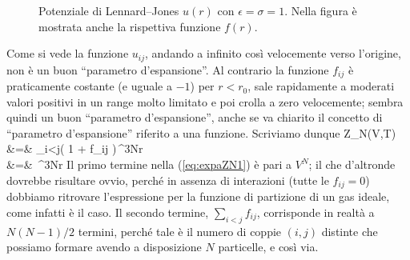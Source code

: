 \begin{figure}[h]
\centering
{}

\caption{Potenziale di Lennard--Jones $u(r)$ con $\epsilon=\sigma=1$. Nella figura è mostrata anche la rispettiva funzione $f(r)$.}
\label{fig:06-deffij}
\end{figure}

Come si vede la funzione $u_{ij}$, andando a infinito così velocemente verso l'origine, non è un buon ``parametro d'espansione''. Al contrario la funzione $f_{ij}$ è praticamente costante (e uguale a $-1$) per $r < r_0$, sale rapidamente a moderati valori positivi in un range molto limitato e poi crolla a zero velocemente; sembra quindi un buon ``parametro d'espansione'', anche se va chiarito il concetto di ``parametro d'espansione'' riferito a una funzione.
Scriviamo dunque
\bea
\label{eq:expaZN1}
Z_N(V,T) &=& \int \prod_{i<j}\left( 1 + f_{ij} \right)\,\de^{3N}r \nonumber \\
&=& \int {}\,\de^{3N}r
\eea
Il primo termine nella (\ref{eq:expaZN1}) è pari a $V^N$; il che d'altronde dovrebbe risultare ovvio, perché in assenza di interazioni (tutte le $f_{ij} = 0$) dobbiamo ritrovare l'espressione per la funzione di partizione di un gas ideale, come infatti è il caso. Il secondo termine, $\sum_{i<j} f_{ij}$, corrisponde in realtà a $N(N-1)/2$ termini, perché tale è il numero di coppie $(i,j)$ distinte che possiamo formare avendo a disposizione $N$ particelle, e così via.

